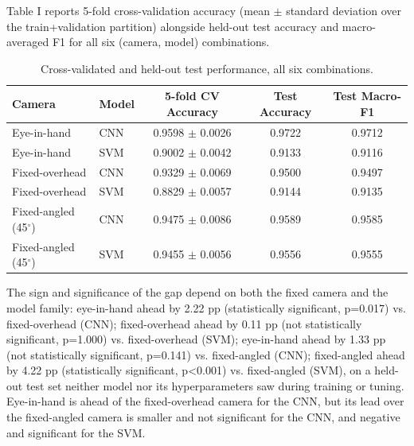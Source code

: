 \documentclass[conference]{IEEEtran}
\begin{document}
Table I reports 5-fold cross-validation accuracy (mean $\pm$ standard deviation over the train+validation partition) alongside held-out test accuracy and macro-averaged F1 for all six (camera, model) combinations.

\begin{table}[t]

\centering

\caption{Cross-validated and held-out test performance, all six combinations.}

\label{tab:main}

\begin{tabular}{llccc}

\toprule

Camera & Model & 5-fold CV Accuracy & Test Accuracy & Test Macro-F1 \\

\midrule

Eye-in-hand & CNN & 0.9598 $\pm$ 0.0026 & 0.9722 & 0.9712 \\

Eye-in-hand & SVM & 0.9002 $\pm$ 0.0042 & 0.9133 & 0.9116 \\

Fixed-overhead & CNN & 0.9329 $\pm$ 0.0069 & 0.9500 & 0.9497 \\

Fixed-overhead & SVM & 0.8829 $\pm$ 0.0057 & 0.9144 & 0.9135 \\

Fixed-angled (45$^\circ$) & CNN & 0.9475 $\pm$ 0.0086 & 0.9589 & 0.9585 \\

Fixed-angled (45$^\circ$) & SVM & 0.9455 $\pm$ 0.0056 & 0.9556 & 0.9555 \\

\bottomrule

\end{tabular}

\end{table}



The sign and significance of the gap depend on both the fixed camera and the model family: eye-in-hand ahead by 2.22 pp (statistically significant, p=0.017) vs. fixed-overhead (CNN); fixed-overhead ahead by 0.11 pp (not statistically significant, p=1.000) vs. fixed-overhead (SVM); eye-in-hand ahead by 1.33 pp (not statistically significant, p=0.141) vs. fixed-angled (CNN); fixed-angled ahead by 4.22 pp (statistically significant, p<0.001) vs. fixed-angled (SVM), on a held-out test set neither model nor its hyperparameters saw during training or tuning. Eye-in-hand is ahead of the fixed-overhead camera for the CNN, but its lead over the fixed-angled camera is smaller and not significant for the CNN, and negative and significant for the SVM.
\end{document}
